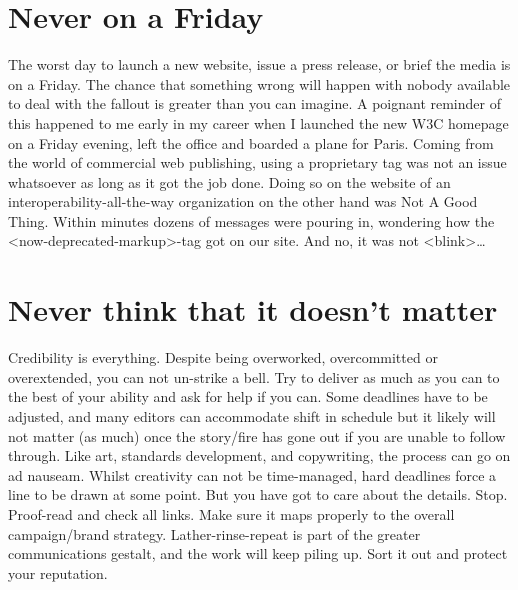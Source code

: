 \section*{Never on a Friday}
The worst day to launch a new website, issue a press release, or brief the media
is on a Friday. The chance that something wrong will happen with nobody
available to deal with the fallout is greater than you can imagine. A poignant
reminder of this happened to me early in my career when I launched the new W3C
homepage on a Friday evening, left the office and boarded a plane for Paris.
Coming from the world of commercial web publishing, using a proprietary tag
was not an issue whatsoever as long as it got the job done. Doing so on the
website of an interoperability-all-the-way organization on the other hand was
Not A Good Thing. Within minutes dozens of messages were pouring in, wondering
how the \textless now-deprecated-markup\textgreater -tag got on our site. And no, it was not \textless blink\textgreater \dots

\section*{Never think that it doesn't matter}
Credibility is everything. Despite being overworked, overcommitted or overextended,
you can not un-strike a bell. Try to deliver as much as you can to the best of
your ability and ask for help if you can. Some deadlines have to be adjusted,
and many editors can accommodate shift in schedule but it likely will not matter
(as much) once the story/fire has gone out if you are unable to follow through.
Like art, standards development, and copywriting, the process can go on ad
nauseam. Whilst creativity can not be time-managed, hard deadlines force a line to
be drawn at some point. But you have got to care about the details. Stop.
Proof-read and check all links. Make sure it maps properly to the overall
campaign/brand strategy. Lather-rinse-repeat is part of the greater
communications gestalt, and the work will keep piling up. Sort it out and
protect your reputation.


